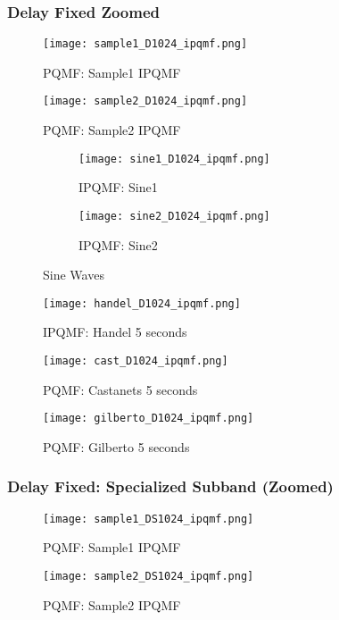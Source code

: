 \documentclass{article} %
\begin{document}
\subsubsection{Delay Fixed Zoomed}

\begin{figure}[H]
\centering
\texttt{[image: sample1\_D1024\_ipqmf.png]}
\caption{PQMF: Sample1 IPQMF}
\end{figure}
\begin{figure}[H]
\centering
\texttt{[image: sample2\_D1024\_ipqmf.png]}
\caption{PQMF: Sample2 IPQMF}
\end{figure}


\begin{figure}[H]

\begin{subfigure}{0.5\textwidth}
\centering
\texttt{[image: sine1\_D1024\_ipqmf.png]}
\caption{IPQMF: Sine1}
\end{subfigure}
\begin{subfigure}{0.5\textwidth}
\centering
\texttt{[image: sine2\_D1024\_ipqmf.png]}
\caption{IPQMF: Sine2}
\end{subfigure}
\caption{Sine Waves}
\end{figure}
 

\begin{figure}[H]
\centering
\texttt{[image: handel\_D1024\_ipqmf.png]}
\caption{IPQMF: Handel 5 seconds}
\end{figure}

\begin{figure}[H]
\centering
\texttt{[image: cast\_D1024\_ipqmf.png]}
\caption{PQMF: Castanets 5 seconds}
\end{figure}


\begin{figure}[H]
\centering
\texttt{[image: gilberto\_D1024\_ipqmf.png]}
\caption{PQMF: Gilberto 5 seconds}
\end{figure}


\subsubsection{Delay Fixed: Specialized Subband (Zoomed)}
\begin{figure}[H]
\centering
\texttt{[image: sample1\_DS1024\_ipqmf.png]}
\caption{PQMF: Sample1 IPQMF}
\end{figure}
\begin{figure}[H]
\centering
\texttt{[image: sample2\_DS1024\_ipqmf.png]}
\caption{PQMF: Sample2 IPQMF}
\end{figure}
\end{document}
